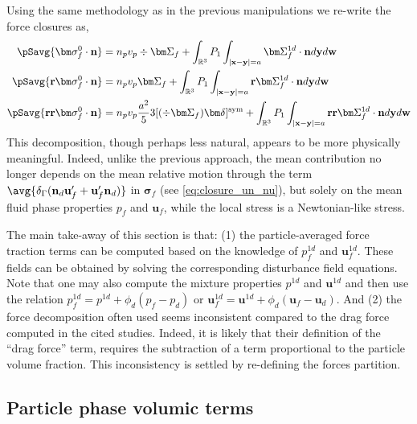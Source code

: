 Using the same methodology as in the previous manipulations we re-write the force closures as, 
\begin{align}
    \pSavg{\bm\sigma_f^0\cdot\textbf{n}}
    &=
    n_p v_p 
    \div\bm\Sigma_f
    +
    \int_{\mathbb{R}^3}
    P_1
    \int_{|\textbf{x}-\textbf{y}|=a}
    \bm\Sigma_f^{1d} \cdot \textbf{n}
    d\textbf{y}d\textbf{w}
    \label{eq:drag_final2}\\
    \pSavg{\textbf{r}\bm\sigma_f^0\cdot\textbf{n}}
    &=
    n_p v_p \bm\Sigma_f
    +
    \int_{\mathbb{R}^3}
    P_1
    \int_{|\textbf{x}-\textbf{y}|=a}
    \textbf{r}\bm\Sigma_f^{1d} \cdot \textbf{n}
    d\textbf{y}
    d\textbf{w}
    \\
    \pSavg{\textbf{rr}\bm\sigma_f^0\cdot\textbf{n}}
    &=
    n_pv_p  \frac{a^2}{5} 3 [(\div \bm\Sigma_f)\bm\delta]^\text{sym}
    +
    \int_{\mathbb{R}^3}
    P_1
    \int_{|\textbf{x}-\textbf{y}|=a}
    \textbf{rr}\bm\Sigma_f^{1d} \cdot \textbf{n}
    d\textbf{y}
    d\textbf{w}
    \label{eq:second_mom_general2}
\end{align}
This decomposition, though perhaps less natural, appears to be more physically meaningful. 
Indeed, unlike the previous approach, the mean contribution no longer depends on the mean relative motion through the term $\avg{\delta_\Gamma (\textbf{n}_d \textbf{u}_f'+  \textbf{u}_f' \textbf{n}_d)}$ in $\bm\sigma_f$ (see \ref{eq:closure_un_nu}), but solely on the mean fluid phase properties $p_f$ and $\textbf{u}_f$, while the local stress is a Newtonian-like stress.  

The main take-away of this section is that: (1)  the particle-averaged force traction terms can be computed based on the knowledge of $p_f^{1d}$ and $\textbf{u}_f^{1d}$. 
These fields can be obtained by solving the corresponding disturbance field equations. 
Note that one may also compute the mixture properties $p^{1d}$ and $\textbf{u}^{1d}$ and then use the relation $p_f^{1d} = p^{1d} + \phi_d (p_f - p_d)$ or $\textbf{u}_f^{1d} = \textbf{u}^{1d} + \phi_d (\textbf{u}_f - \textbf{u}_d)$. 
And (2) the force decomposition often used \citep{jackson2000,zhang1997momentum,wang2021numerical,wang2024effect} seems inconsistent compared to the drag force computed in the cited studies.
Indeed, it is likely that their definition of the ``drag force'' term, requires the subtraction of a term proportional to the particle volume fraction. 
This inconsistency is settled by re-defining the forces partition.  

\subsection{Particle phase volumic terms}


